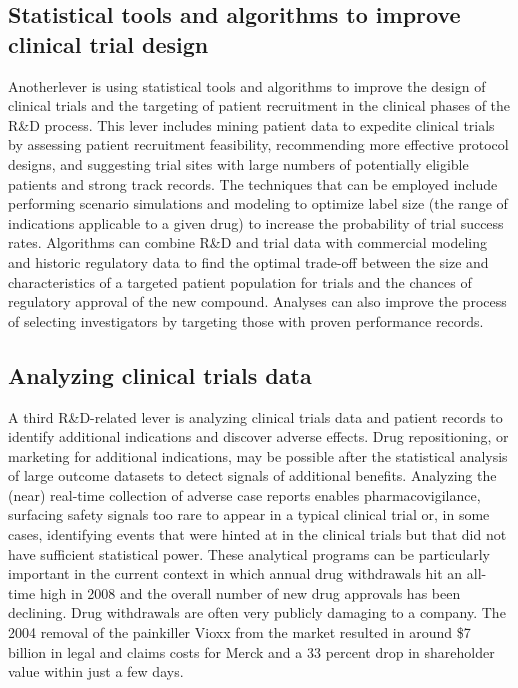 \documentclass[twocolumn]{article}
\begin{document}
\subsection{Statistical tools and algorithms to improve clinical trial design}
Anotherlever is using statistical tools and algorithms to improve the design of clinical trials and the targeting of patient recruitment in the clinical phases of the R\&D process. This lever includes mining patient data to expedite clinical trials by assessing patient recruitment feasibility, recommending more effective protocol designs, and suggesting trial sites with large numbers of potentially eligible patients and strong track records. The techniques that can be employed include performing scenario simulations and modeling to optimize label size (the range of indications applicable to a given drug) to increase the probability of trial success rates. Algorithms can combine R\&D and trial data with commercial modeling and historic regulatory data to find the optimal trade-off between the size and characteristics of a targeted patient population for trials and the chances of regulatory approval of the new compound. Analyses can also improve the process of selecting investigators by targeting those with proven performance records.

\subsection{Analyzing clinical trials data}
A third R\&D-related lever is analyzing clinical trials data and patient records to identify additional indications and discover adverse effects. Drug repositioning, or marketing for additional indications, may be possible after the statistical analysis of large outcome datasets to detect signals of additional benefits. Analyzing the (near) real-time collection of adverse case reports enables pharmacovigilance, surfacing safety signals too rare to appear in a typical clinical trial or, in some cases, identifying events that were hinted at in the clinical trials but that did not have sufficient statistical power.
These analytical programs can be particularly important in the current context in which annual drug withdrawals hit an all-time high in 2008 and the overall number of new drug approvals has been declining. Drug withdrawals are often very publicly damaging to a company. The 2004 removal of the painkiller Vioxx from the market resulted in around \$7 billion in legal and claims costs for Merck and a 33 percent drop in shareholder value within just a few days.
\end{document}
